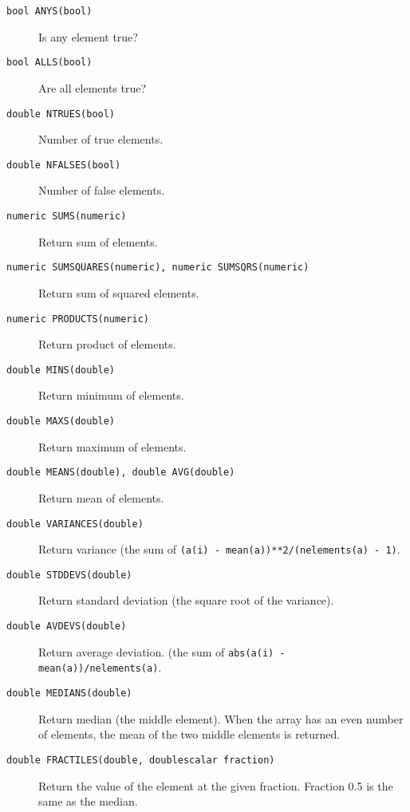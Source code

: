 \begin{description}
  \item[ \texttt{bool ANYS(bool)}] Is any element true?
  \item[ \texttt{bool ALLS(bool)}] Are all elements true?
  \item[ \texttt{double NTRUES(bool)}] Number of true elements.
  \item[ \texttt{double NFALSES(bool)}] Number of false elements.
  \item[ \texttt{numeric SUMS(numeric)}] Return sum of elements.
  \item[ \texttt{numeric SUMSQUARES(numeric), numeric SUMSQRS(numeric)}]
       Return sum of squared elements.
  \item[ \texttt{numeric PRODUCTS(numeric)}] Return product of elements.
  \item[ \texttt{double MINS(double)}] Return minimum of elements.
  \item[ \texttt{double MAXS(double)}] Return maximum of elements.
  \item[ \texttt{double MEANS(double), double AVG(double)}]
    Return mean of elements.
  \item[ \texttt{double VARIANCES(double)}] Return variance
    (the sum of \texttt{(a(i) - mean(a))**2/(nelements(a) - 1)}.
  \item[ \texttt{double STDDEVS(double)}] Return standard
    deviation (the square root of the variance).
  \item[ \texttt{double AVDEVS(double)}] Return average deviation.
    (the sum of \texttt{abs(a(i) - mean(a))/nelements(a)}.
  \item[ \texttt{double MEDIANS(double)}] Return median (the
    middle element).
    When the array has an even number of elements, the mean of
    the two middle elements is returned.
  \item[ \texttt{double FRACTILES(double, doublescalar fraction)}]
       Return the value of the element at the given fraction.
       Fraction 0.5 is the same as the median.
\end{description}

